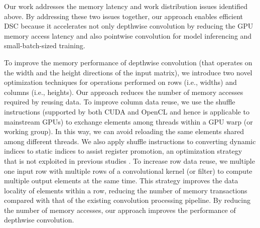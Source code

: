 Our work addresses the memory latency and work distribution issues identified above. By addressing these two issues together, our approach
enables efficient DSC because it accelerates not only depthwise convolution by reducing the GPU memory access latency and also pointwise
convolution for model inferencing and small-batch-sized training.


To improve the memory performance of depthwise convolution (that operates on the width and the height directions of the input matrix), we
introduce two novel optimization techniques for operations performed on rows (i.e., widths) and columns (i.e., heights). Our approach
reduces the number of memory accesses required by reusing data. To improve column data reuse, we use the shuffle instructions (supported by
both CUDA and OpenCL and hence is applicable to mainstream GPUs) to exchange elements among threads within a GPU warp (or working group).
In this way, we can avoid reloading the same elements shared among different threads. We also apply shuffle instructions to converting
dynamic indices to static indices to assist register promotion, an optimization strategy that is not exploited in previous studies
\cite{vasilache2014fast}. To increase row data reuse, we multiple one input row with multiple rows of a convolutional kernel (or filter) to
compute multiple output elements at the same time. This strategy improves the data locality of elements within a row, reducing the number
of memory transactions compared with that of the existing convolution processing pipeline. By reducing the number of memory accesses, our
approach improves the performance of depthwise convolution.

